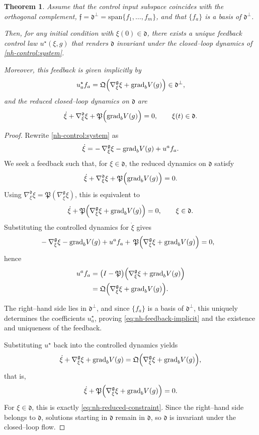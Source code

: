 \documentclass[10pt,a4paper]{amsart}
\newtheorem{theorem}{Theorem}
\newcommand{\g}{\mathfrak{g}}
\newcommand{\grad}{\normalfont{\text{grad}}}
\newcommand{\h}{\mathfrak{d}}
\begin{document}
\begin{theorem}\label{nh-orthogonal:input:thm}
Assume that the control input subspace coincides with the orthogonal complement, $\mathfrak{f} = \h^\perp = \mathrm{span}\{f_1,\dots,f_m\}$, and that $\{f_a\}$ is a basis of $\h^\perp$.

Then, for any initial condition with $\xi(0)\in\h$, there exists a unique feedback 
control law $u^\star(\xi,g)$ that renders $\h$ invariant under the closed--loop 
dynamics of \eqref{nh-control:system}.  

Moreover, this feedback is given implicitly by
\begin{equation}\label{eq:nh-feedback-implicit}
    u^{\star}_a f_a 
    = \mathfrak{Q}\Big(
        \nabla^{\g}_{\xi}\xi 
        + \grad_{b} V(g)
      \Big)\in\h^\perp,
\end{equation}
and the reduced closed--loop dynamics on $\h$ are
\begin{equation}\label{eq:nh-reduced-constraint}
    \dot{\xi} 
    + \nabla^{\h}_{\xi}\xi
    + \mathfrak{P}\Big(
        \grad_{b} V(g)
      \Big) = 0,
    \qquad \xi(t)\in\h.
\end{equation}
\end{theorem}

\begin{proof}
Rewrite \eqref{nh-control:system} as
\[
\dot{\xi} 
= -\,\nabla^{\g}_{\xi}\xi 
  - \grad_{b} V(g)
  + u^{a}f_a.
\]
We seek a feedback such that, for $\xi\in\h$, the reduced dynamics on $\h$ satisfy
\[
\dot{\xi} + \nabla^\h_{\xi}\xi
+ \mathfrak{P}\Big(
    \grad_{b} V(g)
  \Big) = 0.
\]
Using $\nabla^\h_{\xi}\xi = \mathfrak{P}(\nabla^\g_{\xi}\xi)$, this is equivalent to
\[
\dot{\xi} 
+ \mathfrak{P}\Big(
    \nabla^\g_{\xi}\xi 
    + \grad_{b} V(g)
  \Big) = 0,
\qquad \xi\in\h.
\]
Substituting the controlled dynamics for $\dot\xi$ gives
\begin{align}
&-\nabla^{\g}_{\xi}\xi 
 - \grad_{b} V(g)
 + u^{a}f_a +\, \mathfrak{P}\Big(
    \nabla^\g_{\xi}\xi 
    + \grad_{b} V(g)
  \Big) = 0,
\end{align}
hence
\begin{align}
u^{a}f_a
&= \big(I-\mathfrak{P}\big)\Big(
    \nabla^{\g}_{\xi}\xi 
    + \grad_{b} V(g)
  \Big) \nonumber\\
&= \mathfrak{Q}\Big(
    \nabla^{\g}_{\xi}\xi 
    + \grad_{b} V(g)
  \Big).
\end{align}

The right--hand side lies in $\h^\perp$, and since $\{f_a\}$ is a basis of $\h^\perp$, 
this uniquely determines the coefficients $u^{\star}_a$, proving \eqref{eq:nh-feedback-implicit} 
and the existence and uniqueness of the feedback.

Substituting $u^\star$ back into the controlled dynamics yields
\[
\dot{\xi} 
+ \nabla^{\g}_{\xi}\xi 
+ \grad_{b} V(g)
= \mathfrak{Q}\Big(
    \nabla^{\g}_{\xi}\xi 
    + \grad_{b} V(g)
  \Big),
\]
that is,
\[
\dot{\xi} 
+ \mathfrak{P}\Big(
    \nabla^{\g}_{\xi}\xi 
    + \grad_{b} V(g)
  \Big) = 0.
\]
For $\xi\in\h$, this is exactly \eqref{eq:nh-reduced-constraint}.
Since the right--hand side belongs to $\h$, solutions starting in $\h$ remain 
in $\h$, so $\h$ is invariant under the closed--loop flow.
\end{proof}
\end{document}
